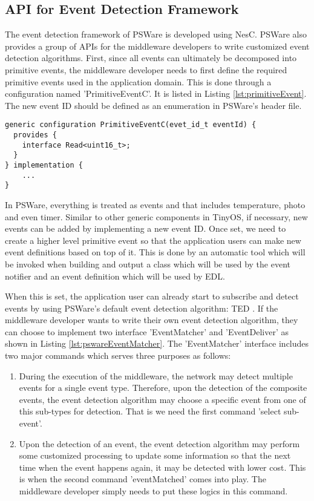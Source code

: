 \subsection{API for Event Detection Framework}
The event detection framework of PSWare is developed using NesC. PSWare also provides a group of APIs for the middleware developers to write customized event detection algorithms. First, since all events can ultimately be decomposed into primitive events, the middleware developer needs to first define the required primitive events used in the application domain. This is done through a configuration named 'PrimitiveEventC'. It is listed in Listing \ref{lst:primitiveEvent}. The new event ID should be defined as an enumeration in PSWare's header file.
\begin{lstlisting}[caption=Primitive event component in NesC, label=lst:primitiveEvent]
generic configuration PrimitiveEventC(evet_id_t eventId) {
  provides {
    interface Read<uint16_t>;
  }
} implementation {
	...
}
\end{lstlisting}

In PSWare, everything is treated as events and that includes temperature, photo and even timer. Similar to other generic components in TinyOS, if necessary, new events can be added by implementing a new event ID. Once set, we need to create a higher level primitive event so that the application users can make new event definitions based on top of it. This is done by an automatic tool which will be invoked when building and output a class which will be used by the event notifier and an event definition which will be used by EDL.

When this is set, the application user can already start to subscribe and detect events by using PSWare's default event detection algorithm: TED \cite{lai:ted}. If the middleware developer wants to write their own event detection algorithm, they can choose to implement two interface 'EventMatcher' and 'EventDeliver' as shown in Listing \ref{lst:pswareEventMatcher}. The 'EventMatcher' interface includes two major commands which serves three purposes as follows:
\begin{enumerate}
\item During the execution of the middleware, the network may detect multiple events for a single event type. Therefore, upon the detection of the composite events, the event detection algorithm may choose a specific event from one of this sub-types for detection. That is we need the first command 'select sub-event'.
\item Upon the detection of an event, the event detection algorithm may perform some customized processing to update some information so that the next time when the event happens again, it may be detected with lower cost. This is when the second command 'eventMatched' comes into play. The middleware developer simply needs to put these logics in this command.
\end{enumerate}

